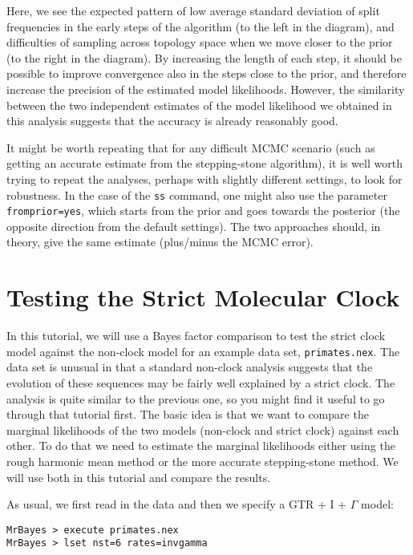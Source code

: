 \documentclass[12pt]{book}
\begin{document}
Here, we see the expected pattern of low average standard deviation of split frequencies in the
early steps of the algorithm (to the left in the diagram), and difficulties of sampling across
topology space when we move closer to the prior (to the right in the diagram). By increasing the
length of each step, it should be possible to improve convergence also in the steps close to the
prior, and therefore increase the precision of the estimated model likelihoods. However, the
similarity between the two independent estimates of the model likelihood we obtained in this
analysis suggests that the accuracy is already reasonably good.

It might be worth repeating that for any difficult MCMC scenario (such as getting an accurate
estimate from the stepping-stone algorithm), it is well worth trying to repeat the analyses,
perhaps with slightly different settings, to look for robustness. In the case of the \texttt{ss}
command, one might also use the parameter \texttt{fromprior=yes}, which starts from the prior and
goes towards the posterior (the opposite direction from the default settings). The two approaches
should, in theory, give the same estimate (plus/minus the MCMC error).

\section{Testing the Strict Molecular Clock}
\label{strictClock}

In this tutorial, we will use a Bayes factor comparison to test the strict clock model against the
non-clock model for an example data set, \texttt{primates.nex}. The data set is unusual in that a
standard non-clock analysis suggests that the evolution of these sequences may be fairly well
explained by a strict clock. The analysis is quite similar to the previous one, so you might find
it useful to go through that tutorial first. The basic idea is that we want to compare the marginal
likelihoods of the two models (non-clock and strict clock) against each other. To do that we need
to estimate the marginal likelihoods either using the rough harmonic mean method or the more
accurate stepping-stone method. We will use both in this tutorial and compare the results.

As usual, we first read in the data and then we specify a GTR + I + $\Gamma$ model:

\begin{Verbatim}
MrBayes > execute primates.nex
MrBayes > lset nst=6 rates=invgamma
\end{Verbatim}
\end{document}
